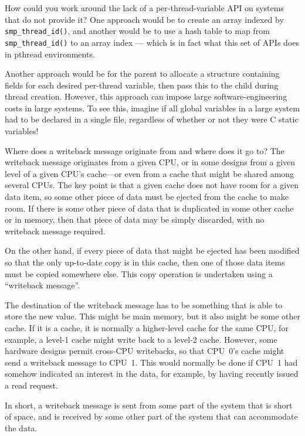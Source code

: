\begin{enumerate}
\QuickQ{}
	How could you work around the lack of a per-thread-variable
	API on systems that do not provide it?
\QuickA{}
	One approach would be to create an array indexed by
	{\tt smp\_thread\_id()}, and another would be to use a hash
	table to map from {\tt smp\_thread\_id()} to an array
	index --- which is in fact what this
	set of APIs does in pthread environments.

	Another approach would be for the parent to allocate a structure
	containing fields for each desired per-thread variable, then
	pass this to the child during thread creation.
	However, this approach can impose large software-engineering
	costs in large systems.
	To see this, imagine if all global variables in a large system
	had to be declared in a single file, regardless of whether or
	not they were C static variables!

\QuickQ{}
	Where does a writeback message originate from and where does
	it go to?
\QuickA{}
	The writeback message originates from a given CPU, or in some
	designs from a given level of a given CPU's cache---or even
	from a cache that might be shared among several CPUs.
	The key point is that a given cache does not have room for
	a given data item, so some other piece of data must be ejected
	from the cache to make room.
	If there is some other piece of data that is duplicated in some
	other cache or in memory, then that piece of data may be simply
	discarded, with no writeback message required.

	On the other hand, if every piece of data that might be ejected
	has been modified so that the only up-to-date copy is in this
	cache, then one of those data items must be copied somewhere
	else.
	This copy operation is undertaken using a ``writeback message''.

	The destination of the writeback message has to be something
	that is able to store the new value.
	This might be main memory, but it also might be some other cache.
	If it is a cache, it is normally a higher-level cache for the
	same CPU, for example, a level-1 cache might write back to a
	level-2 cache.
	However, some hardware designs permit cross-CPU writebacks,
	so that CPU~0's cache might send a writeback message to CPU~1.
	This would normally be done if CPU~1 had somehow indicated
	an interest in the data, for example, by having recently
	issued a read request.

	In short, a writeback message is sent from some part of the
	system that is short of space, and is received by some other
	part of the system that can accommodate the data.


\end{enumerate}

